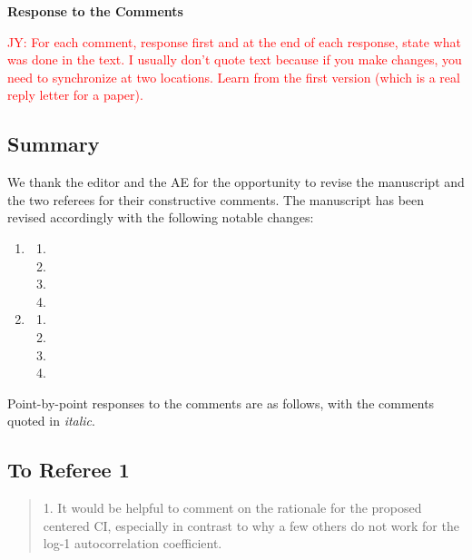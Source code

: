 \documentclass[12pt]{article}
\newcommand{\jy}[1]{\textcolor{red}{JY: #1}}
\newenvironment{comment}%
{\begin{quotation}\noindent\small\it\color{darkblue}\ignorespaces%
}{\end{quotation}}
\begin{document}
\begin{center}
  {\Large\bf Response to the Comments}
\end{center}



\jy{For each comment, response first and at the end of each response,
  state what was done in the text. I usually don't quote text because
  if you make changes, you need to synchronize at two locations. Learn
  from the first version (which is a real reply letter for a paper).}

\subsection*{Summary}

We thank the editor and the AE for the opportunity to revise the manuscript and
the two referees for their constructive comments. The manuscript has been
revised accordingly with the following notable changes:
\begin{enumerate}
\item 
  \begin{enumerate}
    \item 
    \item 
    \item 
    \item 
    \end{enumerate}
\item 
  \begin{enumerate}
  \item 
  \item 
  \item 
  \item 
  \end{enumerate}
\end{enumerate}



Point-by-point responses to the comments are as follows, with the
comments quoted in \emph{\color{darkblue} italic}.

\subsection*{To Referee 1}

\begin{comment}
1. It would be helpful to comment on the rationale for the proposed centered CI, 
especially in contrast to why a few others do not work for the log-1 
autocorrelation coefficient.
\end{comment}
\end{document}
